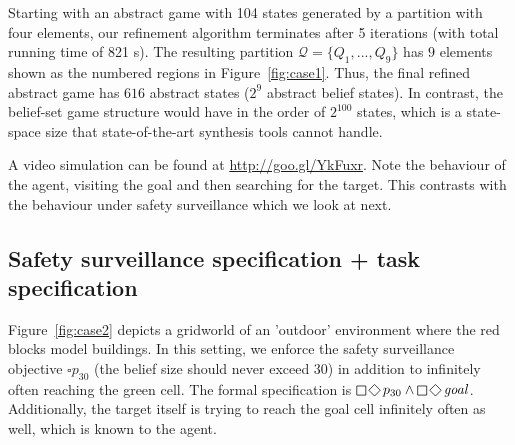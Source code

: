 
Starting with an abstract game with 104 states generated by a partition with four elements, our refinement algorithm terminates after 5 iterations (with total running time of 821 s). The resulting partition $\mathcal{Q} = \{Q_1,...,Q_9 \}$ has $9$ elements shown as the numbered regions in Figure~\ref{fig:case1}. Thus, the final refined abstract game has $616$ abstract states ($2^9$ abstract belief states). In contrast, the belief-set game structure would have in the order of $2^{100}$ states, which is a state-space size that state-of-the-art synthesis tools cannot handle.



A video simulation can be found at \url{http://goo.gl/YkFuxr}. Note the behaviour of the agent, visiting the goal and then searching for the target. This contrasts with the behaviour under safety surveillance which we look at next.

\subsection{Safety surveillance specification + task specification}
Figure~\ref{fig:case2} depicts a gridworld of an 'outdoor' environment where the red blocks model buildings. 
In this setting, we enforce the safety surveillance objective $\square p_{30}$ (the belief size should never exceed 30) in addition to infinitely often reaching the green cell. The formal specification is $\LTLglobally\LTLfinally p_{30} \wedge \LTLglobally\LTLfinally \mathit{goal}$. Additionally, the target itself is trying to reach the goal cell infinitely often as well, which is known to the agent.

